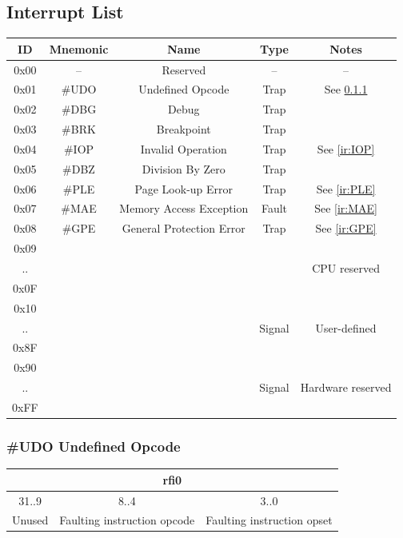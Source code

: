 \documentclass[a4paper,10pt]{article}
\begin{document}
\subsection{Interrupt List} \label{ir:list}
\begin{table}[H]
	\centering
	{
		\begin{tabular}{|c|c|c|c|c|}
\hline
ID & Mnemonic & Name & Type & Notes \\
\hline
0x00 & -- & Reserved & -- & -- \\
\hline
0x01 & \#UDO & Undefined Opcode & Trap & See \ref{ir:UDO} \\
\hline
0x02 & \#DBG & Debug & Trap & \\
\hline
0x03 & \#BRK & Breakpoint & Trap & \\
\hline
0x04 & \#IOP & Invalid Operation & Trap & See \ref{ir:IOP} \\
\hline
0x05 & \#DBZ & Division By Zero & Trap & \\
\hline
0x06 & \#PLE & Page Look-up Error & Trap & See \ref{ir:PLE} \\
\hline
0x07 & \#MAE & Memory Access Exception & Fault & See \ref{ir:MAE} \\
\hline
0x08 & \#GPE & General Protection Error & Trap & See \ref{ir:GPE} \\
\hline
0x09 & & & & \\
.. & & & & CPU reserved \\
0x0F & & & & \\
\hline
0x10 & & & & \\
.. & & & Signal & User-defined \\
0x8F & & & & \\
\hline
0x90 & & & & \\
.. & & & Signal & Hardware reserved \\
0xFF & & & & \\
\hline
		\end{tabular}
	}
\end{table}

\subsubsection{\#UDO Undefined Opcode} \label{ir:UDO}

\begin{table}[H]
	\centering
	{
		\begin{tabular}{|c|c|c|}
\hline
\multicolumn{3}{|c|}{rfi0} \\
\hline
31..9 & 8..4 & 3..0 \\
\hline
Unused & Faulting instruction opcode & Faulting instruction opset \\
\hline
		\end{tabular}
	}
\end{table}
\end{document}

